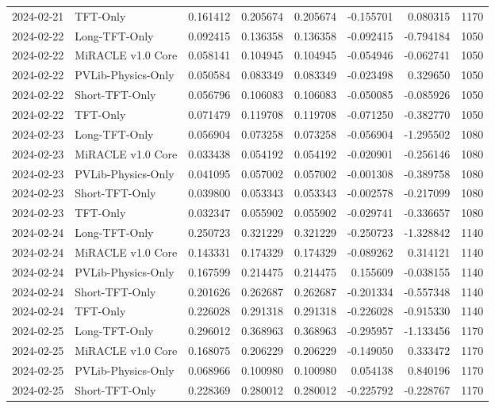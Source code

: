 \begin{tabular}{llrrrrrr}
2024-02-21 & TFT-Only & 0.161412 & 0.205674 & 0.205674 & -0.155701 & 0.080315 & 1170 \\
2024-02-22 & Long-TFT-Only & 0.092415 & 0.136358 & 0.136358 & -0.092415 & -0.794184 & 1050 \\
2024-02-22 & MiRACLE v1.0 Core & 0.058141 & 0.104945 & 0.104945 & -0.054946 & -0.062741 & 1050 \\
2024-02-22 & PVLib-Physics-Only & 0.050584 & 0.083349 & 0.083349 & -0.023498 & 0.329650 & 1050 \\
2024-02-22 & Short-TFT-Only & 0.056796 & 0.106083 & 0.106083 & -0.050085 & -0.085926 & 1050 \\
2024-02-22 & TFT-Only & 0.071479 & 0.119708 & 0.119708 & -0.071250 & -0.382770 & 1050 \\
2024-02-23 & Long-TFT-Only & 0.056904 & 0.073258 & 0.073258 & -0.056904 & -1.295502 & 1080 \\
2024-02-23 & MiRACLE v1.0 Core & 0.033438 & 0.054192 & 0.054192 & -0.020901 & -0.256146 & 1080 \\
2024-02-23 & PVLib-Physics-Only & 0.041095 & 0.057002 & 0.057002 & -0.001308 & -0.389758 & 1080 \\
2024-02-23 & Short-TFT-Only & 0.039800 & 0.053343 & 0.053343 & -0.002578 & -0.217099 & 1080 \\
2024-02-23 & TFT-Only & 0.032347 & 0.055902 & 0.055902 & -0.029741 & -0.336657 & 1080 \\
2024-02-24 & Long-TFT-Only & 0.250723 & 0.321229 & 0.321229 & -0.250723 & -1.328842 & 1140 \\
2024-02-24 & MiRACLE v1.0 Core & 0.143331 & 0.174329 & 0.174329 & -0.089262 & 0.314121 & 1140 \\
2024-02-24 & PVLib-Physics-Only & 0.167599 & 0.214475 & 0.214475 & 0.155609 & -0.038155 & 1140 \\
2024-02-24 & Short-TFT-Only & 0.201626 & 0.262687 & 0.262687 & -0.201334 & -0.557348 & 1140 \\
2024-02-24 & TFT-Only & 0.226028 & 0.291318 & 0.291318 & -0.226028 & -0.915330 & 1140 \\
2024-02-25 & Long-TFT-Only & 0.296012 & 0.368963 & 0.368963 & -0.295957 & -1.133456 & 1170 \\
2024-02-25 & MiRACLE v1.0 Core & 0.168075 & 0.206229 & 0.206229 & -0.149050 & 0.333472 & 1170 \\
2024-02-25 & PVLib-Physics-Only & 0.068966 & 0.100980 & 0.100980 & 0.054138 & 0.840196 & 1170 \\
2024-02-25 & Short-TFT-Only & 0.228369 & 0.280012 & 0.280012 & -0.225792 & -0.228767 & 1170 \\

\end{tabular}
